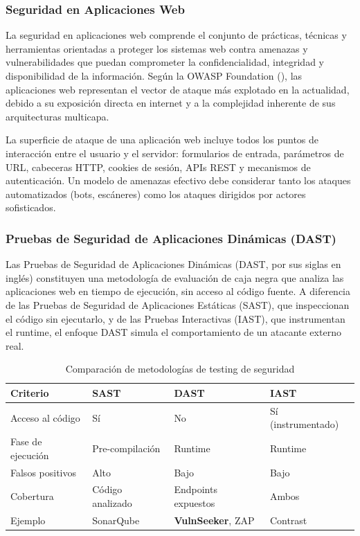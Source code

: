 \documentclass[12pt, a4paper]{article}
\begin{document}
\subsubsection{Seguridad en Aplicaciones Web}

La seguridad en aplicaciones web comprende el conjunto de prácticas, técnicas y
herramientas orientadas a proteger los sistemas web contra amenazas y
vulnerabilidades que puedan comprometer la confidencialidad, integridad y
disponibilidad de la información. Según la OWASP Foundation
(\citeyear*{owasp2021}), las aplicaciones web representan el vector de ataque
más explotado en la actualidad, debido a su exposición directa en internet y a
la complejidad inherente de sus arquitecturas multicapa.

La superficie de ataque de una aplicación web incluye todos los puntos de
interacción entre el usuario y el servidor: formularios de entrada, parámetros
de URL, cabeceras HTTP, cookies de sesión, APIs REST y mecanismos de
autenticación. Un modelo de amenazas efectivo debe considerar tanto los ataques
automatizados (bots, escáneres) como los ataques dirigidos por actores
sofisticados.

\subsubsection{Pruebas de Seguridad de Aplicaciones Dinámicas (DAST)}

Las Pruebas de Seguridad de Aplicaciones Dinámicas (DAST, por sus siglas en
inglés) constituyen una metodología de evaluación de caja negra que analiza las
aplicaciones web en tiempo de ejecución, sin acceso al código fuente. A
diferencia de las Pruebas de Seguridad de Aplicaciones Estáticas (SAST), que
inspeccionan el código sin ejecutarlo, y de las Pruebas Interactivas (IAST),
que instrumentan el runtime, el enfoque DAST simula el comportamiento de un
atacante externo real.

\begin{table}[H]
    \centering
    \caption{Comparación de metodologías de testing de seguridad}
    \label{tab:sast-dast-iast}
    \begin{tabular}{p{3cm} p{3.5cm} p{3.5cm} p{3.5cm}}
        \toprule
        \textbf{Criterio} & \textbf{SAST} & \textbf{DAST} & \textbf{IAST} \\
        \midrule
        Acceso al código & Sí & No & Sí (instrumentado) \\
        Fase de ejecución & Pre-compilación & Runtime & Runtime \\
        Falsos positivos & Alto & Bajo & Bajo \\
        Cobertura & Código analizado & Endpoints expuestos & Ambos \\
        Ejemplo & SonarQube & \textbf{VulnSeeker}, ZAP & Contrast \\
        \bottomrule
    \end{tabular}
\end{table}
\end{document}
